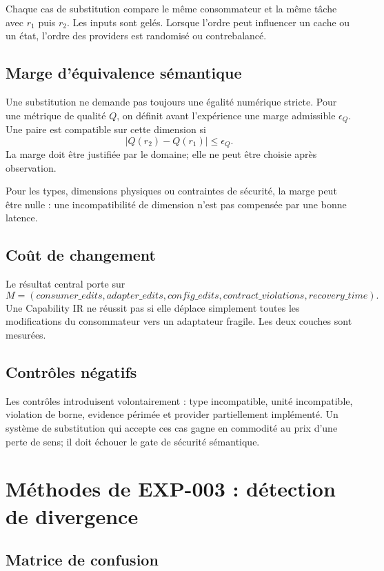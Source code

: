Chaque cas de substitution compare le même consommateur et la même tâche avec $r_1$ puis $r_2$. Les inputs sont gelés. Lorsque l'ordre peut influencer un cache ou un état, l'ordre des providers est randomisé ou contrebalancé.

\section{Marge d'équivalence sémantique}

Une substitution ne demande pas toujours une égalité numérique stricte. Pour une métrique de qualité $Q$, on définit avant l'expérience une marge admissible $\epsilon_Q$. Une paire est compatible sur cette dimension si
\[
|Q(r_2)-Q(r_1)|\leq\epsilon_Q.
\]
La marge doit être justifiée par le domaine; elle ne peut être choisie après observation.

Pour les types, dimensions physiques ou contraintes de sécurité, la marge peut être nulle : une incompatibilité de dimension n'est pas compensée par une bonne latence.

\section{Coût de changement}

Le résultat central porte sur
\[
M=(consumer\_edits,adapter\_edits,config\_edits,contract\_violations,recovery\_time).
\]
Une Capability IR ne réussit pas si elle déplace simplement toutes les modifications du consommateur vers un adaptateur fragile. Les deux couches sont mesurées.

\section{Contrôles négatifs}

Les contrôles introduisent volontairement : type incompatible, unité incompatible, violation de borne, evidence périmée et provider partiellement implémenté. Un système de substitution qui accepte ces cas gagne en commodité au prix d'une perte de sens; il doit échouer le gate de sécurité sémantique.

\chapter{Méthodes de EXP-003 : détection de divergence}

\section{Matrice de confusion}

